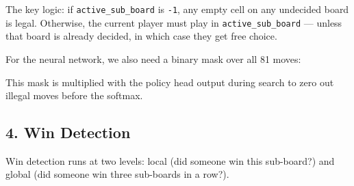 The key logic: if \texttt{active\_sub\_board} is \texttt{-1}, any empty
cell on any undecided board is legal. Otherwise, the current player must
play in \texttt{active\_sub\_board} --- unless that board is already
decided, in which case they get free choice.

For the neural network, we also need a binary mask over all 81 moves:

\begin{Shaded}
\begin{Highlighting}[]
\OperatorTok{{-}\textgreater{}}
\OperatorTok{=}\OperatorTok{=}
\OperatorTok{=} 
\end{Highlighting}
\end{Shaded}

This mask is multiplied with the policy head output during search to
zero out illegal moves before the softmax.

\hypertarget{win-detection}{%
\subsection{4. Win Detection}\label{win-detection}}

Win detection runs at two levels: local (did someone win this
sub-board?) and global (did someone win three sub-boards in a row?).

